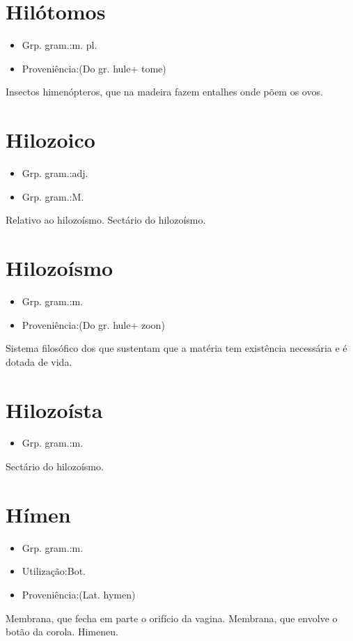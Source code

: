 \documentclass{article}
\begin{document}
\section{Hilótomos}
\begin{itemize}
\item {Grp. gram.:m. pl.}
\end{itemize}
\begin{itemize}
\item {Proveniência:(Do gr. \textunderscore hule\textunderscore  + \textunderscore tome\textunderscore )}
\end{itemize}
Insectos himenópteros, que na madeira fazem entalhes onde põem os ovos.
\section{Hilozoico}
\begin{itemize}
\item {Grp. gram.:adj.}
\end{itemize}
\begin{itemize}
\item {Grp. gram.:M.}
\end{itemize}
Relativo ao hilozoísmo.
Sectário do hilozoísmo.
\section{Hilozoísmo}
\begin{itemize}
\item {Grp. gram.:m.}
\end{itemize}
\begin{itemize}
\item {Proveniência:(Do gr. \textunderscore hule\textunderscore  + \textunderscore zoon\textunderscore )}
\end{itemize}
Sistema filosófico dos que sustentam que a matéria tem existência necessária e é dotada de vida.
\section{Hilozoísta}
\begin{itemize}
\item {Grp. gram.:m.}
\end{itemize}
Sectário do hilozoísmo.
\section{Hímen}
\begin{itemize}
\item {Grp. gram.:m.}
\end{itemize}
\begin{itemize}
\item {Utilização:Bot.}
\end{itemize}
\begin{itemize}
\item {Proveniência:(Lat. \textunderscore hymen\textunderscore )}
\end{itemize}
Membrana, que fecha em parte o orifício da vagina.
Membrana, que envolve o botão da corola.
Himeneu.
\end{document}
